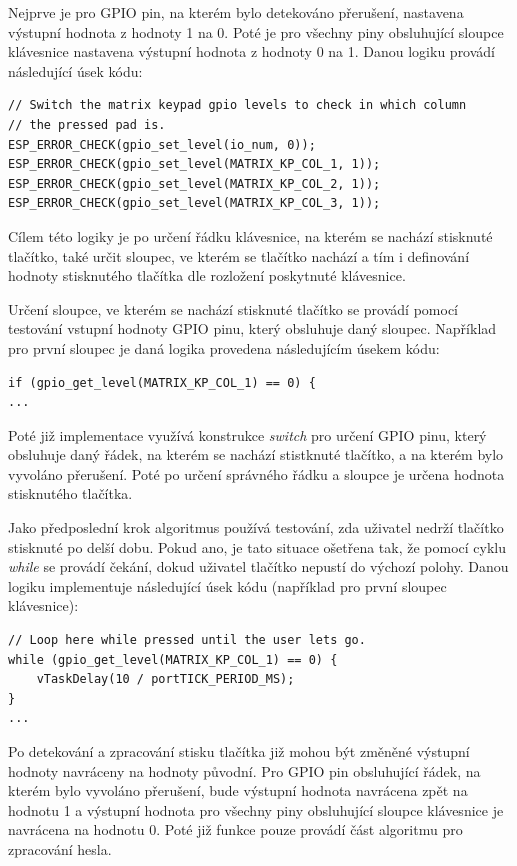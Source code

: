 \documentclass[a4paper, 12pt]{article}
\begin{document}
Nejprve je pro GPIO pin, na kterém bylo detekováno přerušení, nastavena výstupní hodnota z hodnoty 1 na 0. Poté je pro všechny piny obsluhující sloupce klávesnice nastavena výstupní hodnota z hodnoty 0 na 1. Danou logiku provádí následující úsek kódu:

\begin{lstlisting}[style=CLanguage]
// Switch the matrix keypad gpio levels to check in which column
// the pressed pad is.
ESP_ERROR_CHECK(gpio_set_level(io_num, 0));
ESP_ERROR_CHECK(gpio_set_level(MATRIX_KP_COL_1, 1));
ESP_ERROR_CHECK(gpio_set_level(MATRIX_KP_COL_2, 1));
ESP_ERROR_CHECK(gpio_set_level(MATRIX_KP_COL_3, 1));
\end{lstlisting}

Cílem této logiky je po určení řádku klávesnice, na kterém se nachází stisknuté tlačítko, také určit sloupec, ve kterém se tlačítko nachází a tím i definování hodnoty stisknutého tlačítka dle rozložení poskytnuté klávesnice.

Určení sloupce, ve kterém se nachází stisknuté tlačítko se provádí pomocí testování vstupní hodnoty GPIO pinu, který obsluhuje daný sloupec. Například pro první sloupec je daná logika provedena následujícím úsekem kódu:

\begin{lstlisting}[style=CLanguage]
if (gpio_get_level(MATRIX_KP_COL_1) == 0) {  
...
\end{lstlisting}

Poté již implementace využívá konstrukce \textit{switch} pro určení GPIO pinu, který obsluhuje daný řádek, na kterém se nachází stistknuté tlačítko, a na kterém bylo vyvoláno přerušení. Poté po určení správného řádku a sloupce je určena hodnota stisknutého tlačítka.

Jako předposlední krok algoritmus používá testování, zda uživatel nedrží tlačítko stisknuté po delší dobu. Pokud ano, je tato situace ošetřena tak, že pomocí cyklu \textit{while} se provádí čekání, dokud uživatel tlačítko nepustí do výchozí polohy. Danou logiku implementuje následující úsek kódu (například pro první sloupec klávesnice):

\begin{lstlisting}[style=CLanguage]
// Loop here while pressed until the user lets go.
while (gpio_get_level(MATRIX_KP_COL_1) == 0) {
    vTaskDelay(10 / portTICK_PERIOD_MS);
}
...

\end{lstlisting}

Po detekování a zpracování stisku tlačítka již mohou být změněné výstupní hodnoty navráceny na hodnoty původní. Pro GPIO pin obsluhující řádek, na kterém bylo vyvoláno přerušení, bude výstupní hodnota navrácena zpět na hodnotu 1 a výstupní hodnota pro všechny piny obsluhující sloupce klávesnice je navrácena na hodnotu 0. Poté již funkce pouze provádí část algoritmu pro zpracování hesla.
\end{document}
